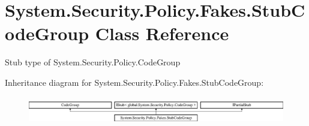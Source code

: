 \hypertarget{class_system_1_1_security_1_1_policy_1_1_fakes_1_1_stub_code_group}{\section{System.\-Security.\-Policy.\-Fakes.\-Stub\-Code\-Group Class Reference}
\label{class_system_1_1_security_1_1_policy_1_1_fakes_1_1_stub_code_group}
}


Stub type of System.\-Security.\-Policy.\-Code\-Group 


Inheritance diagram for System.\-Security.\-Policy.\-Fakes.\-Stub\-Code\-Group\-:\begin{figure}[H]
\begin{center}
\leavevmode
\includegraphics[height=1.208199cm]{class_system_1_1_security_1_1_policy_1_1_fakes_1_1_stub_code_group}
\end{center}
\end{figure}
